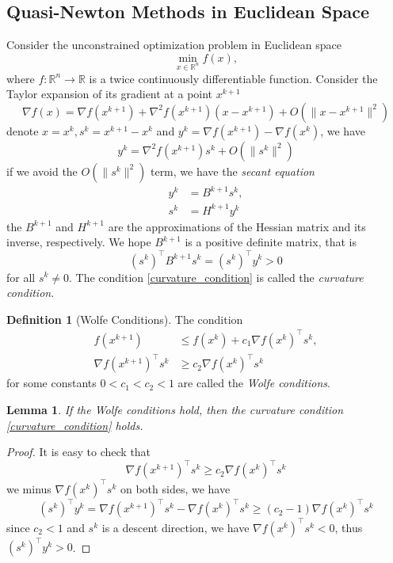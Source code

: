 \documentclass[12pt,a4paper,draft]{article}  %
\newtheorem{lemma}{Lemma}[section]
\theoremstyle{definition}
\newtheorem{definition}{Definition}[section]
\numberwithin{equation}{section}
\newcommand{\RR}{\mathbb{R}}
\begin{document}
\subsection{Quasi-Newton Methods in Euclidean Space}
Consider the unconstrained optimization problem in Euclidean space
\begin{equation}\label{quasi_newton_euclidean}
\min_{x \in \RR^n} f(x),
\end{equation}
where $f: \RR^n \to \RR$ is a twice continuously differentiable function. Consider the Taylor expansion of its gradient at a point $x^{k+1}$
\[
    \nabla f(x) = \nabla f(x^{k+1}) + \nabla^2 f(x^{k+1})(x-x^{k+1}) + O(\|x-x^{k+1}\|^2)
\]
denote $x = x^k, s^k = x^{k+1} - x^k$ and $y^k = \nabla f(x^{k+1}) - \nabla f(x^k)$, we have
\[
y^k = \nabla^2 f(x^{k+1}) s^k + O(\|s^k\|^2)
\]
if we avoid the $O(\|s^k\|^2)$ term, we have the \emph{secant equation}
\begin{align}
        y^k &= B^{k+1} s^k, \label{secant_equation1}\\ 
        s^k &= H^{k+1} y^k \label{secant_equation2}
\end{align}
the $B^{k+1}$ and $H^{k+1}$ are the approximations of the Hessian matrix and its inverse, respectively. We hope $B^{k+1}$ is a positive definite matrix, that is
\begin{equation}\label{curvature_condition}
    (s^k)^\top B^{k+1} s^k = (s^k)^\top y^k > 0
\end{equation}
for all $s^k \neq 0$. The condition \eqref{curvature_condition} is called the \emph{curvature condition}. 
\begin{definition}[Wolfe Conditions]
        The condition
        \begin{align}
        f(x^{k+1}) &\leq f(x^k) + c_1 \nabla f(x^k)^\top s^k,\label{armijo_condition}\\
        \nabla f(x^{k+1})^\top s^k &\geq c_2 \nabla f(x^k)^\top s^k \label{curvature_condition_wolfe}
        \end{align}
        for some constants $0 < c_1 < c_2 < 1$ are called the \emph{Wolfe conditions}.
\end{definition}
\begin{lemma}
        If the Wolfe conditions hold, then the curvature condition \eqref{curvature_condition} holds.
\end{lemma}
\begin{proof}
        It is easy to check that
        \[
                \nabla f(x^{k+1})^\top s^k \geq c_2 \nabla f(x^k)^\top s^k
        \]
        we minus $\nabla f(x^k)^\top s^k$ on both sides, we have
        \[
                (s^k)^\top y^k=\nabla f(x^{k+1})^\top s^k - \nabla f(x^k)^\top s^k \geq (c_2 - 1) \nabla f(x^k)^\top s^k
        \]
        since $c_2 < 1$ and $s^k$ is a descent direction, we have $\nabla f(x^k)^\top s^k < 0$, thus $(s^k)^\top y^k > 0$.
\end{proof}
\end{document}
